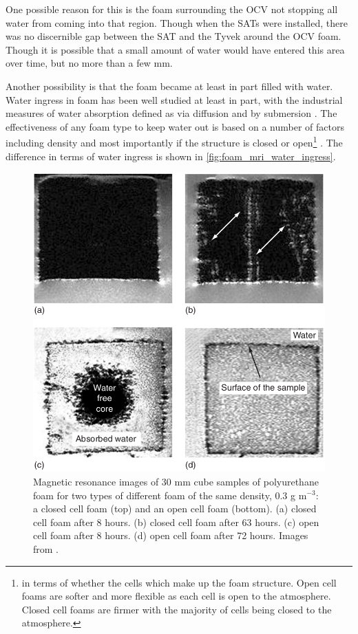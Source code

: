 \par
One possible reason for this is the foam surrounding the OCV not stopping all water from coming into that region.
Though when the SATs were installed, there was no discernible gap between the SAT and the Tyvek around the OCV foam.
Though it is possible that a small amount of water would have entered this area over time, but no more than a few mm.

\par
Another possibility is that the foam became at least in part filled with water.
Water ingress in foam has been well studied at least in part, with the industrial measures of water absorption defined as via diffusion and by submersion \cite{foam_with_water_ref}.
The effectiveness of any foam type to keep water out is based on a number of factors including density and most importantly if the structure is closed or open\footnote{in terms of whether the cells which make up the foam structure. Open cell foams are softer and more flexible as each cell is open to the atmosphere. Closed cell foams are firmer with the majority of cells being closed to the atmosphere.} \cite{mechanical_properties_of_foam_ref}.
The difference in terms of water ingress is shown in \autoref{fig:foam_mri_water_ingress}.


\begin{figure}[!tbhp]
\includegraphics[width=\textwidth]{Figures/NeutronCaptureTime/foam_water_absorption.png}
\centering
\caption{Magnetic resonance images of 30 mm cube samples of polyurethane foam for two types of different foam of the same density, 0.3 g m${}^{-3}$: a closed cell foam (top) and an open cell foam (bottom).
(a) closed cell foam after 8 hours. (b) closed cell foam after 63 hours.
(c) open cell foam after 8 hours. (d) open cell foam after 72 hours.
Images from \cite{foam_mri_data_ref}.
}
\label{fig:foam_mri_water_ingress}
\end{figure}


